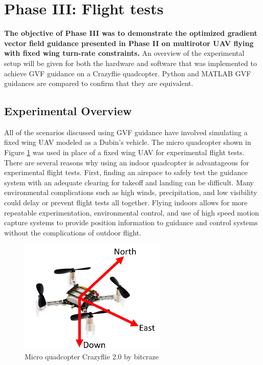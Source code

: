 \documentclass[numbered,pdftex]{ohio-etd}
\begin{document}
\section{Phase III: Flight tests}
\textbf{The objective of Phase III was to demonstrate the optimized gradient vector field guidance presented in Phase II on multirotor UAV flying with fixed wing turn-rate constraints.} An overview of the experimental setup will be given for both the hardware and software that was implemented to achieve GVF guidance on a Crazyflie quadcopter. Python and MATLAB GVF guidances are compared to confirm that they are equivalent.

\subsection{Experimental Overview}
All of the scenarios discussed using GVF guidance have involved simulating a fixed wing UAV modeled as a Dubin's vehicle. The micro quadcopter shown in Figure \ref{fig:crazyflie2} was used in place of a fixed wing UAV for experimental flight tests. There are several reasons why using an indoor quadcopter is advantageous for experimental flight tests. First, finding an airspace to safely test the guidance system with an adequate clearing for takeoff and landing can be difficult. Many environmental complications such as high winds, precipitation, and low visibility could delay or prevent flight tests all together.  Flying indoors allows for more repeatable experimentation, environmental control, and use of high speed motion capture systems to provide position information to guidance and control systems without the complications of outdoor flight. 



\begin{figure}
	\centering
	\includegraphics[trim=0 0 0 0,clip,width=7cm]{PaperFigures/methods/crazyflieNED}
	\caption{Micro quadcopter Crazyflie 2.0 by bitcraze}
	\label{fig:crazyflie2}
\end{figure}
\end{document}
